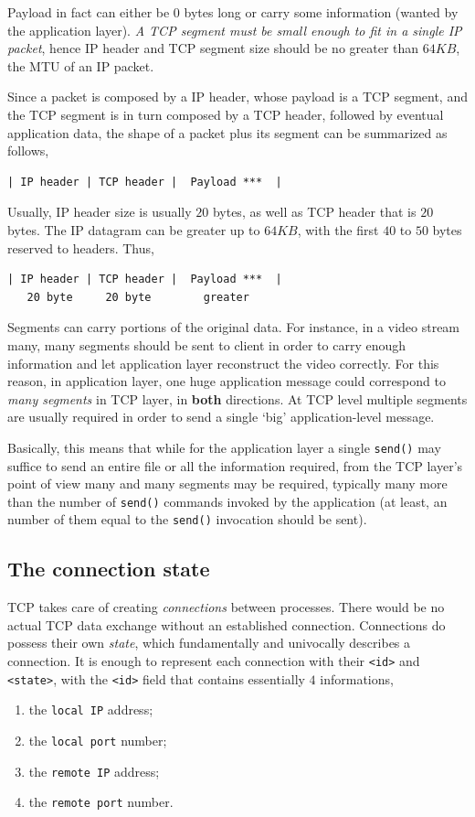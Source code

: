 \documentclass[10pt]{book}
\begin{document}
Payload in fact can either be $0$ bytes long or carry some information (wanted
by the application layer). \emph{A TCP segment must be small enough to fit in a
single IP packet}, hence IP header and TCP segment size should be no greater
than $64KB$, the MTU of an IP packet.

Since a packet is composed by a IP header, whose payload is a TCP segment, and the
TCP segment is in turn composed by a TCP header, followed by eventual
application data, the shape of a packet plus its segment can be summarized as
follows,

\begin{verbatim}
| IP header | TCP header |  Payload ***  |
\end{verbatim}

Usually, IP header size is usually $20$ bytes, as well as TCP
header that is $20$ bytes. The IP datagram can be greater up to $64KB$, with
the first $40$ to $50$ bytes reserved to headers. Thus,

\begin{verbatim}
| IP header | TCP header |  Payload ***  |
   20 byte     20 byte        greater
\end{verbatim}

Segments can carry portions of the original data. For instance, in a video
stream many, many segments should be sent to client in order to carry enough
information and let application layer reconstruct the video correctly. For
this reason, in application layer, one huge application message could correspond to
\emph{many segments} in TCP layer, in \textbf{both} directions. At TCP
level multiple segments are usually required in order to send a single
`big' application-level message.

Basically, this means that while for the application layer a single
\texttt{send()} may suffice to send an entire file or all the information
required, from the TCP layer's point of view many and many segments may be
required, typically many more than the number of \texttt{send()} commands
invoked by the application (at least, an number of them equal to the
\texttt{send()} invocation should be sent).

\subsection{The connection state}

TCP takes care of creating \emph{connections} between processes. There would be
no actual TCP data exchange without an established connection. Connections do
possess their own \emph{state}, which fundamentally and univocally describes a
connection. It is enough to represent each connection with their \texttt{<id>}
and \texttt{<state>}, with the \texttt{<id>} field that contains essentially
$4$ informations,
\begin{enumerate}
    \item the \texttt{local IP} address;
    \item the \texttt{local port} number;
    \item the \texttt{remote IP} address;
    \item the \texttt{remote port} number.
\end{enumerate}
\end{document}
